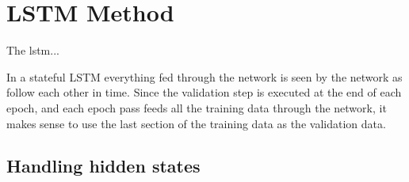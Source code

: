 \section{LSTM Method}
The lstm...


In a stateful LSTM everything fed through the network is seen by the network
as follow each other in time. Since the validation step is executed at the end of
each epoch, and each epoch pass feeds all the training data through the network,
it makes sense to use the last section of the training data as the validation data.

\subsection*{Handling hidden states}







